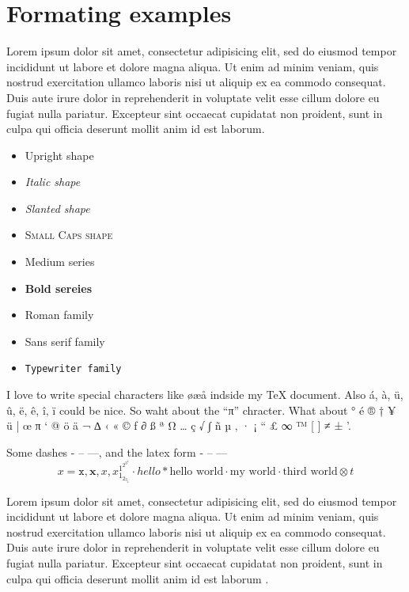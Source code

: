 \chapter{Formating examples}
Lorem ipsum dolor sit amet, consectetur adipisicing elit, sed do eiusmod tempor incididunt ut labore et dolore magna aliqua. Ut enim ad minim veniam, quis nostrud exercitation ullamco laboris nisi ut aliquip ex ea commodo consequat. Duis aute irure dolor in reprehenderit in voluptate velit esse cillum dolore eu fugiat nulla pariatur. Excepteur sint occaecat cupidatat non proident, sunt in culpa qui officia deserunt mollit anim id est laborum.


\begin{itemize}
    \item \textup{Upright shape}
    \item \textit{Italic shape}
    \item \textsl{Slanted shape}
    \item \textsc{Small Caps shape}
    \item \textmd{Medium series}
    \item \textbf{Bold sereies}
    \item \textrm{Roman family}
    \item \textsf{Sans serif family}
    \item \texttt{Typewriter family}
\end{itemize}

I love to write special characters like øæå indside my \TeX{} document. Also á, à, ü, û, ë, ê, î, ï could be nice. So waht about the ``π'' chracter. What about ° é ® † ¥ ü | œ π ‘ @ ö ä ¬ ∆ ‹ « © ƒ ∂ ß ª Ω … ç √ ∫ ñ µ ‚ · ¡ “ £ ∞ ™ [ ] ≠ ± '.

Some dashes - – —, and the latex form - -- ---
\begin{equation*}
    x = \mathtt{x}, \mathbf{x}, \mathit{x}, x_{1_{2_{3_{4}}}}^{1^{2^{3^{4}}}} \cdot hello * \text{hello world} ⋅ \text{my world} · \text{third world} ⊗ t
\end{equation*}

Lorem ipsum dolor sit amet, consectetur adipisicing elit, sed do eiusmod tempor incididunt ut labore et dolore magna aliqua. Ut enim ad minim veniam, quis nostrud exercitation ullamco laboris nisi ut aliquip ex ea commodo consequat. Duis aute irure dolor in reprehenderit in voluptate velit esse cillum dolore eu fugiat nulla pariatur. Excepteur sint occaecat cupidatat non proident, sunt in culpa qui officia deserunt mollit anim id est laborum \cite{adams1980hitchhiker}.


